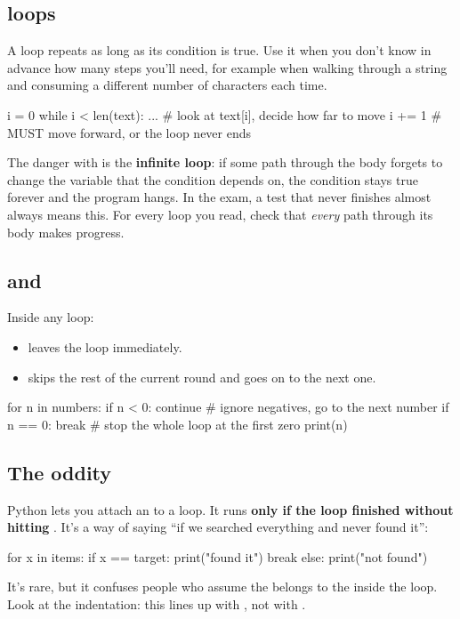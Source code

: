 \documentclass[10pt,a4paper]{article}
\begin{document}
\subsection{ loops}
A  loop repeats as long as its condition is true. Use it when you don’t know in advance how many steps you’ll need, for example when walking through a string and consuming a different number of characters each time.
\begin{pycode}
i = 0
while i < len(text):
    ...          # look at text[i], decide how far to move
    i += 1       # MUST move forward, or the loop never ends
\end{pycode}
The danger with  is the \textbf{infinite loop}: if some path through the body forgets to change the variable that the condition depends on, the condition stays true forever and the program hangs. In the exam, a test that never finishes almost always means this. For every  loop you read, check that \emph{every} path through its body makes progress.
\subsection{ and }
Inside any loop:
\begin{itemize}
\item {} leaves the loop immediately.
\item {} skips the rest of the current round and goes on to the next one.
\end{itemize}
\begin{pycode}
for n in numbers:
    if n < 0:
        continue      # ignore negatives, go to the next number
    if n == 0:
        break         # stop the whole loop at the first zero
    print(n)
\end{pycode}
\subsection{The  oddity}
Python lets you attach an  to a loop. It runs \textbf{only if the loop finished without hitting }. It’s a way of saying “if we searched everything and never found it”:
\begin{pycode}
for x in items:
    if x == target:
        print("found it")
        break
else:
    print("not found")
\end{pycode}
It’s rare, but it confuses people who assume the  belongs to the  inside the loop. Look at the indentation: this  lines up with , not with .
\setcounter{section}{4}
\end{document}
